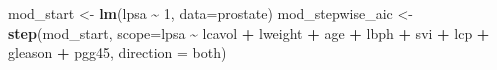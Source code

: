 \documentclass[
]{article}
\newenvironment{Shaded}{\begin{snugshade}}{\end{snugshade}}
\newcommand{\AttributeTok}[1]{\textcolor[rgb]{0.13,0.29,0.53}{#1}}
\newcommand{\DecValTok}[1]{\textcolor[rgb]{0.00,0.00,0.81}{#1}}
\newcommand{\FunctionTok}[1]{\textcolor[rgb]{0.13,0.29,0.53}{\textbf{#1}}}
\newcommand{\NormalTok}[1]{#1}
\newcommand{\OtherTok}[1]{\textcolor[rgb]{0.56,0.35,0.01}{#1}}
\newcommand{\SpecialCharTok}[1]{\textcolor[rgb]{0.81,0.36,0.00}{\textbf{#1}}}
\newcommand{\StringTok}[1]{\textcolor[rgb]{0.31,0.60,0.02}{#1}}
\begin{document}
\begin{enumerate}
\begin{Shaded}
\begin{Highlighting}[]
\NormalTok{mod\_start }\OtherTok{\textless{}{-}} \FunctionTok{lm}\NormalTok{(lpsa }\SpecialCharTok{\textasciitilde{}} \DecValTok{1}\NormalTok{, }\AttributeTok{data=}\NormalTok{prostate)}
\NormalTok{mod\_stepwise\_aic }\OtherTok{\textless{}{-}} \FunctionTok{step}\NormalTok{(mod\_start, }\AttributeTok{scope=}\NormalTok{lpsa }\SpecialCharTok{\textasciitilde{}}\NormalTok{ lcavol }\SpecialCharTok{+}\NormalTok{ lweight }\SpecialCharTok{+}\NormalTok{ age }\SpecialCharTok{+}\NormalTok{ lbph }\SpecialCharTok{+}\NormalTok{ svi }\SpecialCharTok{+}\NormalTok{ lcp }\SpecialCharTok{+}\NormalTok{ gleason }\SpecialCharTok{+}\NormalTok{ pgg45, }\AttributeTok{direction =} \StringTok{\textquotesingle{}both\textquotesingle{}}\NormalTok{)}
\end{Highlighting}
\end{Shaded}


\end{enumerate}
\end{document}
